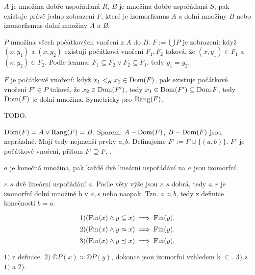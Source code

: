 \documentclass[12pt]{article}                   %
\begin{document}

    \begin{veta}
        $A$ je množina dobře uspořádaná $R$, $B$ je množina dobře uspořádaná $S$, pak existuje právě jedno zobrazení $F$, které je izomorfismus $A$ a dolní množiny $B$ nebo izomorfismus dolní množiny $A$ a $B$.

        \begin{dukazin}
            $P$ množina všech počátkových vnoření z $A$ do $B$. $F := \bigcup P$ je zobrazení: když $(x, y_1)$ a $(x, y_2)$ existují počátková vnoření $F_1, F_2$ taková, že $(x, y_1) \in F_1$ a $(x, y_2) \in F_2$. Podle lemma: $F_1 \subseteq F_2 \lor F_2 \subseteq F_1$, tedy $y_1 = y_2$.

            $F$ je počátkové vnoření: když $x_1 <_R x_2 \in \operatorname{Dom}(F)$, pak existuje počátkové vnoření $F' \in P$ takové, že $x_2 \in \operatorname{Dom}(F')$, tedy $x_1 \in \operatorname{Dom}(F') \subseteq \operatorname{Dom} F$, tedy $\operatorname{Dom}(F)$ je dolní množina. Symetricky pro $\operatorname{Rang}(F)$.

            TODO.

            $\operatorname{Dom}(F) = A \lor \operatorname{Rang}(F) = B$: Sporem: $A - \operatorname{Dom}(F)$, $B - \operatorname{Dom}(F)$ jsou neprázdné. Mají tedy nejmenší prvky $a, b$. Definujeme $F' := F \cup \{(a, b)\}$. $F'$ je počátkové vnoření, přitom $F' \supseteq F$, \lightning.
        \end{dukazin}
    \end{veta}

    \begin{veta}
        $a$ je konečná množina, pak každé dvě lineární uspořádání na $a$ jsou izomorfní.

        \begin{dukazin}
            $r, s$ dvě lineární uspořádání $a$. Podle věty výše jsou $r, s$ dobrá, tedy $a, r$ je izomorfní dolní množině b v $a, s$ nebo naopak. Tzn. $a \approx b$, tedy z definice konečnosti $b = a$.
        \end{dukazin}
    \end{veta}

    \begin{lemma}
        $$ 1) (\operatorname{Fin}(x) \land y \subseteq x) \implies \operatorname{Fin}(y). $$
        $$ 2) (\operatorname{Fin}(x) \land y \approx x) \implies \operatorname{Fin}(y). $$
        $$ 3) (\operatorname{Fin}(x) \land y \preceq x) \implies \operatorname{Fin}(y). $$ 


        \begin{dukazin}
            $1)$ z definice. $2)$ $©P(x) \approx ©P(y)$, dokonce jsou izomorfní vzhledem k $\subseteq$. $3)$ z $1)$ a $2)$.
        \end{dukazin}
    \end{lemma}
    
\end{document}

